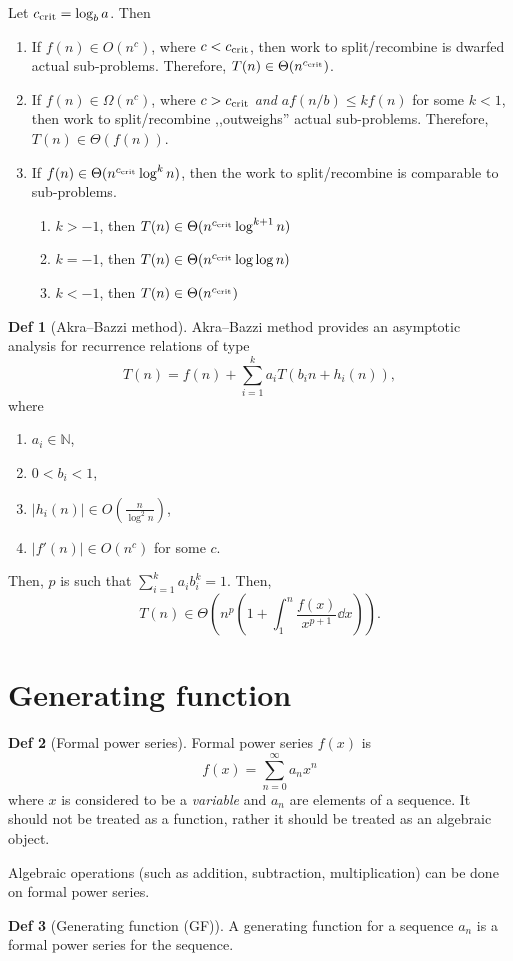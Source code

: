 \documentclass[a4paper]{article}
\theoremstyle{definition}
\newtheorem{definition}{Def}
\begin{document}
Let \({c_\text{crit}} = \log_b a\).
Then
\begin{enumerate}
  \item If \(f(n) \in O(n^c)\), where  \(c < {c_\text{crit}}\), then
    work to split/recombine is dwarfed actual sub-problems.
    Therefore, \(T(n) \in \Theta(n^{c_\text{crit}})\).
  \item If \(f(n) \in \Omega(n^c)\), where \(c > {c_\text{crit}}\)
    \textit{and}
    \(a f(n/b) \le k f(n)\) for some \(k < 1\),
    then
    work to split/recombine ,,outweighs'' actual sub-problems.
    Therefore, \(T(n) \in \Theta(f(n))\).
  \item If \(f(n) \in \Theta(n^{c_\text{crit}} \log^k n)\), then
    the work to split/recombine is comparable to sub-problems.
    \begin{enumerate}
      \item \(k > -1\), then \(T(n) \in \Theta(n^{c_\text{crit}} \log^{k + 1} n)\)
      \item \(k = -1\), then \(T(n) \in \Theta(n^{c_\text{crit}} \log \log n)\)
      \item \(k < -1\), then \(T(n) \in \Theta(n^{c_\text{crit}})\)
    \end{enumerate}
\end{enumerate}

\begin{definition}[Akra--Bazzi method]
  Akra--Bazzi method provides an asymptotic analysis for recurrence
  relations of type
  \[
    T(n) = f(n) + \sum_{i = 1}^k a_i T(b_i n + h_i(n)),
  \]
  where
  \begin{enumerate}
    \item \(a_i \in \mathbb{N}\),
    \item \(0 < b_i < 1\),
    \item \(|h_i(n)| \in O(\frac{n}{\log^2 n})\),
    \item \(|f'(n)| \in O(n^c)\) for some \(c\).
  \end{enumerate}
  Then, \(p\) is such that \(\sum_{i = 1}^k a_i b_i^k = 1\).
  Then,
  \[
    T(n) \in \Theta
    \left( n^p \left( 1 + \int_1^n \frac{f(x)}{x^{p + 1}} \dd x \right)  \right)
  .\]
\end{definition}


\section{Generating function}

\begin{definition}[Formal power series]
  Formal power series \(f(x)\) is
  \[
    f(x) = \sum_{n = 0}^\infty a_n x^n
  \]
  where \(x\) is considered to be a \textit{variable}
  and \(a_n\) are elements of a sequence.
  It should not be treated as a function, rather
  it should be treated as an algebraic object.
\end{definition}
Algebraic operations (such as addition, subtraction, multiplication)
can be done on formal power series.
\begin{definition}[Generating function (GF)]
  A generating function for a sequence \(a_n\) is a
  formal power series for the sequence.
\end{definition}
\end{document}
